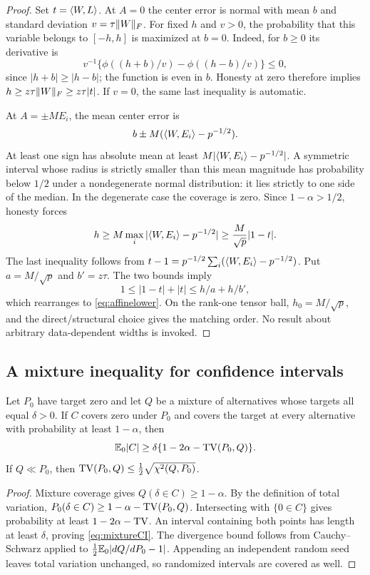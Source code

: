 \begin{proof}
Set $t=\langle W,L\rangle$. At $A=0$ the center error is normal with mean $b$ and standard deviation $v=\tau\lVert W\rVert_F$. For fixed $h$ and $v>0$, the probability that this variable belongs to $[-h,h]$ is maximized at $b=0$. Indeed, for $b\ge0$ its derivative is
\[
 v^{-1}\{\phi((h+b)/v)-\phi((h-b)/v)\}\le0,
\]
since $|h+b|\ge|h-b|$; the function is even in $b$. Honesty at zero therefore implies $h\ge z\tau\lVert W\rVert_F\ge z\tau|t|$. If $v=0$, the same last inequality is automatic.

At $A=\pm M E_i$, the mean center error is
\[
 b\pm M(\langle W,E_i\rangle-p^{-1/2}).
\]
At least one sign has absolute mean at least $M|\langle W,E_i\rangle-p^{-1/2}|$. A symmetric interval whose radius is strictly smaller than this mean magnitude has probability below $1/2$ under a nondegenerate normal distribution: it lies strictly to one side of the median. In the degenerate case the coverage is zero. Since $1-\alpha>1/2$, honesty forces
\[
 h\ge M\max_i|\langle W,E_i\rangle-p^{-1/2}|
 \ge\frac M{\sqrt p}|1-t|.
\]
The last inequality follows from $t-1=p^{-1/2}\sum_i(\langle W,E_i\rangle-p^{-1/2})$. Put $a=M/\sqrt p$ and $b'=z\tau$. The two bounds imply
\[
 1\le|1-t|+|t|\le h/a+h/b',
\]
which rearranges to \eqref{eq:affinelower}. On the rank-one tensor ball, $h_0=M/\sqrt p$, and the direct/structural choice gives the matching order. No result about arbitrary data-dependent widths is invoked.
\end{proof}

\subsection{A mixture inequality for confidence intervals}

\begin{lemma}\label{lem:mixture}
Let $P_0$ have target zero and let $Q$ be a mixture of alternatives whose targets all equal $\delta>0$. If $C$ covers zero under $P_0$ and covers the target at every alternative with probability at least $1-\alpha$, then
\begin{equation}\label{eq:mixtureCI}
 \mathbb E_0|C|\ge\delta\{1-2\alpha-\operatorname{TV}(P_0,Q)\}.
\end{equation}
If $Q\ll P_0$, then $\operatorname{TV}(P_0,Q)\le\frac12\sqrt{\chi^2(Q,P_0)}$.
\end{lemma}

\begin{proof}
Mixture coverage gives $Q(\delta\in C)\ge1-\alpha$. By the definition of total variation, $P_0(\delta\in C)\ge1-\alpha-\operatorname{TV}(P_0,Q)$. Intersecting with $\{0\in C\}$ gives probability at least $1-2\alpha-\operatorname{TV}$. An interval containing both points has length at least $\delta$, proving \eqref{eq:mixtureCI}. The divergence bound follows from Cauchy--Schwarz applied to $\frac12\mathbb E_0|dQ/dP_0-1|$. Appending an independent random seed leaves total variation unchanged, so randomized intervals are covered as well.
\end{proof}


